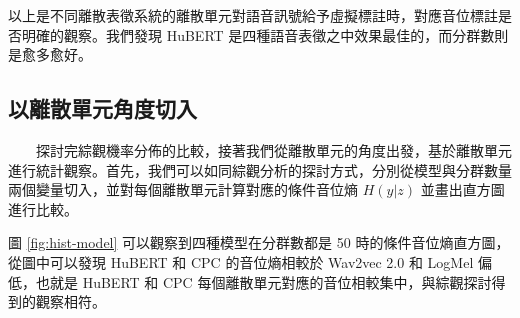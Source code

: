         以上是不同離散表徵系統的離散單元對語音訊號給予虛擬標註時，對應音位標註是否明確的觀察。我們發現 HuBERT 是四種語音表徵之中效果最佳的，而分群數則是愈多愈好。

\subsection{以離散單元角度切入}  %

　　探討完綜觀機率分佈的比較，接著我們從離散單元的角度出發，基於離散單元進行統計觀察。首先，我們可以如同綜觀分析的探討方式，分別從模型與分群數量兩個變量切入，並對每個離散單元計算對應的條件音位熵 $H(y|z)$ 並畫出直方圖進行比較。

        圖 \ref{fig:hist-model} 可以觀察到四種模型在分群數都是 50 時的條件音位熵直方圖，從圖中可以發現 HuBERT 和 CPC 的音位熵相較於 Wav2vec 2.0 和 LogMel 偏低，也就是 HuBERT 和 CPC 每個離散單元對應的音位相較集中，與綜觀探討得到的觀察相符。
